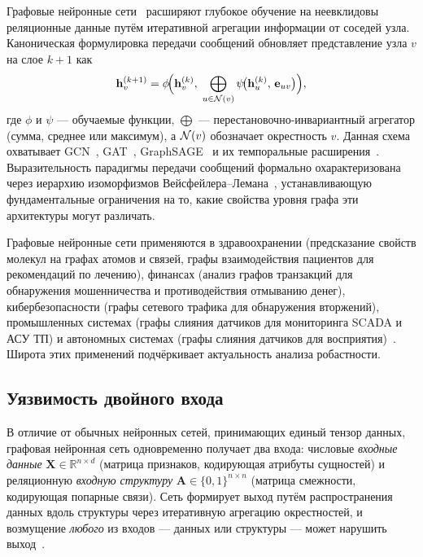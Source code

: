 Графовые нейронные сети~\cite{Kipf2017,Velickovic2018,Hamilton2017} расширяют глубокое обучение на неевклидовы реляционные данные путём итеративной агрегации информации от соседей узла. Каноническая формулировка передачи сообщений обновляет представление узла $v$ на слое $k+1$ как
\begin{equation}
\mathbf{h}_v^{(k+1)}
= \phi\!\Bigl(\mathbf{h}_v^{(k)},\;
  \bigoplus_{u\in\mathcal{N}(v)}
    \psi\!\bigl(\mathbf{h}_u^{(k)},\, \mathbf{e}_{uv}\bigr)\Bigr),
\label{eq:ch1_mp}
\end{equation}
где $\phi$ и $\psi$ --- обучаемые функции, $\bigoplus$ --- перестановочно-инвариантный агрегатор (сумма, среднее или максимум), а $\mathcal{N}(v)$ обозначает окрестность $v$. Данная схема охватывает GCN~\cite{Kipf2017}, GAT~\cite{Velickovic2018}, GraphSAGE~\cite{Hamilton2017} и их темпоральные расширения~\cite{Xu2020tgat,Rossi2020,Pei2020tgn,Kazemi2020,Schlichtkrull2018}. Выразительность парадигмы передачи сообщений формально охарактеризована через иерархию изоморфизмов Вейсфейлера--Лемана~\cite{Xu2019gin}, устанавливающую фундаментальные ограничения на то, какие свойства уровня графа эти архитектуры могут различать.

Графовые нейронные сети применяются в здравоохранении (предсказание свойств молекул на графах атомов и связей, графы взаимодействия пациентов для рекомендаций по лечению), финансах (анализ графов транзакций для обнаружения мошенничества и противодействия отмыванию денег), кибербезопасности (графы сетевого трафика для обнаружения вторжений), промышленных системах (графы слияния датчиков для мониторинга SCADA и АСУ ТП) и автономных системах (графы слияния датчиков для восприятия)~\cite{Goodfellow2014gan,Gilmer2017,Gilmer2018,Ying2021,Wu2021,Luo2021}. Широта этих применений подчёркивает актуальность анализа робастности.


\subsection{Уязвимость двойного входа}

В отличие от обычных нейронных сетей, принимающих единый тензор данных, графовая нейронная сеть одновременно получает два входа: числовые \emph{входные данные} $\mathbf{X}\in\mathbb{R}^{n\times d}$ (матрица признаков, кодирующая атрибуты сущностей) и реляционную \emph{входную структуру} $\mathbf{A}\in\{0,1\}^{n\times n}$ (матрица смежности, кодирующая попарные связи). Сеть формирует выход путём распространения данных вдоль структуры через итеративную агрегацию окрестностей, и возмущение \emph{любого} из входов --- данных или структуры --- может нарушить выход~\cite{Zuegner2018,Bojchevski2019,Dai2018}.

